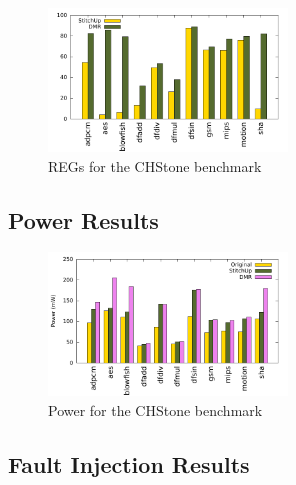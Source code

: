 \begin{figure}[h]
\centering
\includegraphics[width=2.5in]{./graphs/chstone_reg_24_09_2015.pdf}
\caption{REGs for the CHStone benchmark}
\label{fig:regs_result}
\end{figure}

\subsection{Power Results}

\begin{figure}[h]
\centering
\includegraphics[width=2.5in]{./graphs/chstone_absolute_power_24_09_2015.pdf}
\caption{Power for the CHStone benchmark}
\label{fig:power_result}
\end{figure}

\subsection{Fault Injection Results}
